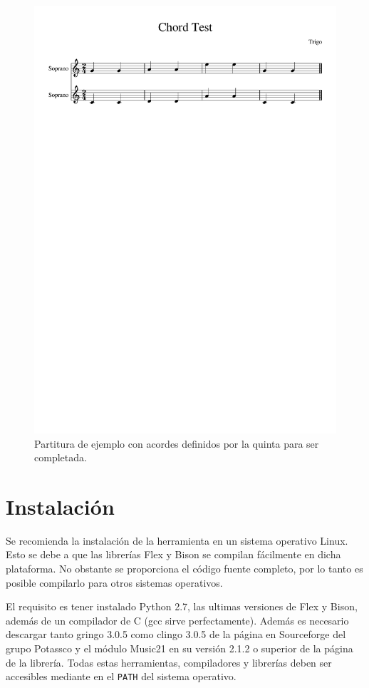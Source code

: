   \begin{figure}
  	\centering
  	\includegraphics[width=0.8\linewidth]{imagenes/scores/Chord_Test.pdf}
  	\caption{Partitura de ejemplo con acordes definidos por la quinta para ser completada.}
  	\label{fig:chord_test}
  \end{figure}
 
\chapter{Instalación}
\label{chap:installation}
Se recomienda la instalación de la herramienta en un sistema operativo Linux. Esto se debe a que las librerías Flex y Bison se  compilan fácilmente en dicha plataforma. No obstante se proporciona el código fuente completo, por lo tanto es posible compilarlo para otros sistemas operativos.

El requisito es tener instalado Python 2.7, las ultimas versiones de Flex y Bison, además de un compilador de C (gcc sirve perfectamente). Además es necesario descargar tanto gringo 3.0.5 como clingo 3.0.5 de la página en Sourceforge del grupo Potassco\cite{potasscoweb} y el módulo Music21 en su versión 2.1.2 o superior de la página de la librería. Todas estas herramientas, compiladores y librerías deben ser accesibles mediante en el \texttt{PATH} del sistema operativo.

